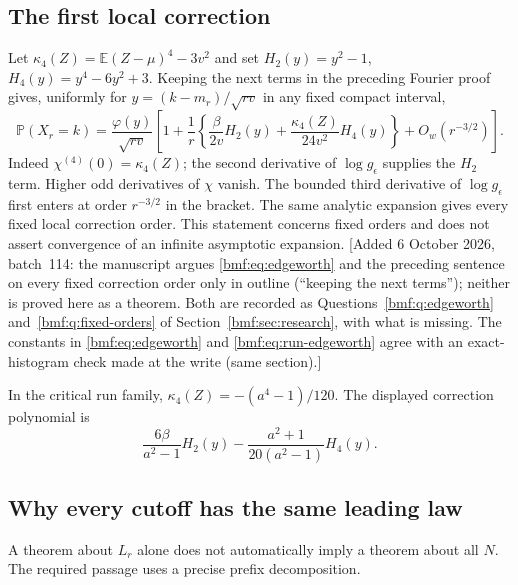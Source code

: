 \documentclass[11pt]{article}
\numberwithin{equation}{section}
\theoremstyle{definition}
\theoremstyle{remark}
\newcommand{\E}{\mathbb E}
\newcommand{\Prob}{\mathbb P}
\newcommand{\ph}{\varphi}
\begin{document}
\subsection{The first local correction}

Let $\kappa_4(Z)=\E(Z-\mu)^4-3v^2$ and set
$H_2(y)=y^2-1$, $H_4(y)=y^4-6y^2+3$.
Keeping the next terms in the preceding Fourier proof gives,
uniformly for $y=(k-m_r)/\sqrt{rv}$ in any fixed compact interval,
\begin{equation}\label{bmf:eq:edgeworth}
 \Prob(X_r=k)=\frac{\ph(y)}{\sqrt{rv}}
 \left[
 1+\frac1r\left\{
 \frac{\beta}{2v}H_2(y)
 +\frac{\kappa_4(Z)}{24v^2}H_4(y)
 \right\}+O_w(r^{-3/2})
 \right].
\end{equation}
Indeed $\chi^{(4)}(0)=\kappa_4(Z)$; the second derivative
of $\log g_\epsilon$ supplies the $H_2$ term. Higher odd
derivatives of $\chi$ vanish. The bounded third derivative of
$\log g_\epsilon$ first enters at order $r^{-3/2}$ in the bracket.
The same analytic expansion gives every fixed local correction
order. This statement concerns fixed orders and does not assert
convergence of an infinite asymptotic expansion.
[Added 6 October 2026, batch~114: the manuscript argues
\eqref{bmf:eq:edgeworth} and the preceding sentence on every fixed
correction order only in outline (``keeping the next terms''); neither is
proved here as a theorem. Both are recorded as
Questions~\ref{bmf:q:edgeworth} and~\ref{bmf:q:fixed-orders} of
Section~\ref{bmf:sec:research}, with what is missing. The constants in
\eqref{bmf:eq:edgeworth} and \eqref{bmf:eq:run-edgeworth} agree with an
exact-histogram check made at the write (same section).]

In the critical run family,
$\kappa_4(Z)=-(a^4-1)/120$. The displayed correction polynomial is
\begin{equation}\label{bmf:eq:run-edgeworth}
 \frac{6\beta}{a^2-1}H_2(y)
 -\frac{a^2+1}{20(a^2-1)}H_4(y).
\end{equation}

\subsection{Why every cutoff has the same leading law}

A theorem about $L_r$ alone does not automatically imply a theorem
about all $N$. The required passage uses a precise prefix
decomposition.
\end{document}
